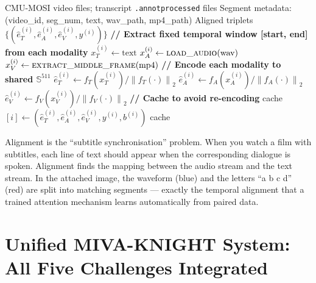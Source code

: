 \documentclass[12pt,a4paper]{article}
\theoremstyle{definition}
\theoremstyle{plain}
\theoremstyle{remark}
\newcommand{\Sph}{\mathbb{S}}
\newcommand{\Norm}[1]{\left\|#1\right\|}
\begin{document}
\begin{algorithm}[H]
\caption{CMU-MOSI Segment-Level Temporal Alignment (Pipeline E)}
\label{alg:align_mosi}
\begin{algorithmic}[1]
\Require CMU-MOSI video files; transcript \texttt{.annotprocessed} files
\Require Segment metadata: (video\_id, seg\_num, text, wav\_path, mp4\_path)
\Ensure Aligned triplets $\{(\hat{e}_T^{(i)}, \hat{e}_A^{(i)}, \hat{e}_V^{(i)}, y^{(i)})\}$
  \State \textbf{// Extract fixed temporal window [start, end] from each modality}
  \State $x_T^{(i)} \gets \text{text}$ 
  \State $x_A^{(i)} \gets \textsc{load\_audio}(\text{wav})$ 
  \State $x_V^{(i)} \gets \textsc{extract\_middle\_frame}(\text{mp4})$ 
  \State \textbf{// Encode each modality to shared $\Sph^{511}$}
  \State $\hat{e}_T^{(i)} \gets f_T(x_T^{(i)}) / \Norm{f_T(\cdot)}_2$
  \State $\hat{e}_A^{(i)} \gets f_A(x_A^{(i)}) / \Norm{f_A(\cdot)}_2$
  \State $\hat{e}_V^{(i)} \gets f_V(x_V^{(i)}) / \Norm{f_V(\cdot)}_2$
  \State \textbf{// Cache to avoid re-encoding}
  \State cache$[i] \gets (\hat{e}_T^{(i)}, \hat{e}_A^{(i)}, \hat{e}_V^{(i)}, y^{(i)}, b^{(i)})$
\EndFor
\State \Return cache 
\end{algorithmic}
\end{algorithm}

\begin{tcolorbox}[laymanbox]
Alignment is the ``subtitle synchronisation'' problem. When you watch a film with subtitles, each line of text should appear when the corresponding dialogue is spoken. Alignment finds the mapping between the audio stream and the text stream. In the attached image, the waveform (blue) and the letters ``a b c d'' (red) are split into matching segments — exactly the temporal alignment that a trained attention mechanism learns automatically from paired data.
\end{tcolorbox}

\newpage
\section{Unified MIVA-KNIGHT System: All Five Challenges Integrated}
\label{sec:unified}
\end{document}
